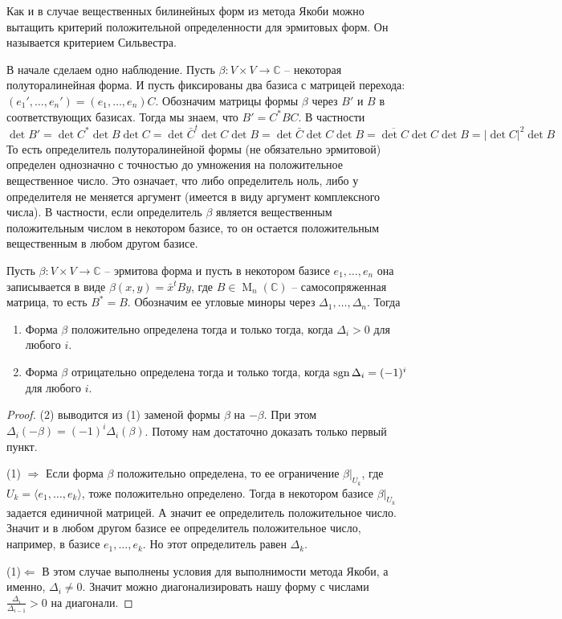 Как и в случае вещественных билинейных форм из метода Якоби можно вытащить критерий положительной определенности для эрмитовых форм.
Он называется критерием Сильвестра.

В  начале сделаем одно наблюдение.
Пусть $\beta\colon V\times V\to \mathbb C$ -- некоторая полуторалинейная форма.
И пусть фиксированы два базиса с матрицей перехода: $(e_1',\ldots,e_n') = (e_1,\ldots,e_n)C$.
Обозначим матрицы формы $\beta$ через $B'$ и $B$ в соответствующих базисах.
Тогда мы знаем, что $B' = C^* B C$.
В частности
\[
\det B' = \det C^*\det B \det C = \det\bar C^t \det C\det B = \det \bar C\det C\det B = \overline{\det C}\det C \det B = |\det C|^2 \det B
\]
То есть определитель полуторалинейной формы (не обязательно эрмитовой) определен однозначно с точностью до умножения на положительное вещественное число.
Это означает, что либо определитель ноль, либо у определителя не меняется аргумент (имеется в виду аргумент комплексного числа).
В частности, если определитель $\beta$ является вещественным положительным числом в некотором базисе, то он остается положительным вещественным в любом другом базисе.

\begin{claim}
Пусть $\beta\colon V\times V\to \mathbb C$ -- эрмитова форма и пусть в некотором базисе $e_1,\ldots,e_n$ она записывается в виде $\beta(x, y) = \bar x^t B y$, где $B\in\operatorname{M}_n (\mathbb C)$ -- самосопряженная матрица, то есть $B^* = B$.
Обозначим ее угловые миноры через $\Delta_1,\ldots,\Delta_n$.
Тогда
\begin{enumerate}
\item Форма $\beta$ положительно определена тогда и только тогда, когда $\Delta_i > 0$ для любого $i$.

\item Форма $\beta$ отрицательно определена тогда и только тогда, когда $\operatorname{sgn} \Delta_i = (-1)^i$ для любого $i$.
\end{enumerate}
\end{claim}
\begin{proof}
(2) выводится из (1) заменой формы $\beta$ на $-\beta$.
При этом $\Delta_i(-\beta) = (-1)^i \Delta_i(\beta)$.
Потому нам достаточно доказать только первый пункт.

(1) $\Rightarrow$ Если форма $\beta$ положительно определена, то ее ограничение $\beta|_{U_k}$, где $U_k = \langle e_1,\ldots,e_k\rangle$, тоже положительно определено.
Тогда в некотором базисе $\beta|_{U_k}$ задается единичной матрицей.
А значит ее определитель положительное число.
Значит и в любом другом базисе ее определитель положительное число, например, в базисе $e_1,\ldots,e_k$.
Но этот определитель равен $\Delta_k$.

(1)$\Leftarrow$ В этом случае выполнены условия для выполнимости метода Якоби, а именно, $\Delta_i\neq 0$.
Значит можно диагонализировать нашу форму с числами $\frac{\Delta_i}{\Delta_{i-1}} > 0$ на диагонали.
\end{proof}

